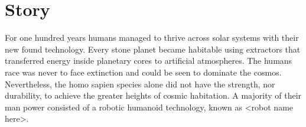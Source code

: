 \documentclass[../Main.tex]{subfiles}
\begin{document}
\section{Story}


For one hundred years humans managed to thrive across solar systems with their new found technology. Every stone planet became habitable using extractors that transferred energy inside planetary cores to artificial atmospheres. The humans race was never to face extinction and could be seen to dominate the cosmos. Nevertheless, the homo sapien species alone did not have the strength, nor durability, to achieve the greater heights of cosmic habitation. A majority of their man power consisted of a robotic humanoid technology, known as <robot name here>.
\end{document}
